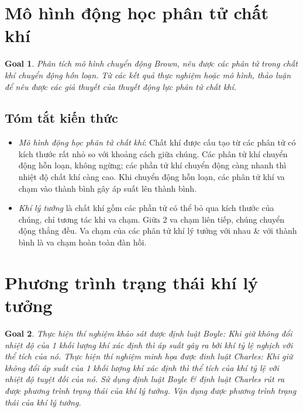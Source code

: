 \documentclass{article}
\newtheorem{goal}{Goal}
\begin{document}

\section{Mô hình động học phân tử chất khí}

\begin{goal}
	Phân tích mô hình chuyển động Brown, nêu được các phân tử trong chất khí chuyển động hỗn loạn. Từ các kết quả thực nghiệm hoặc mô hình, thảo luận để nêu được các giả thuyết của thuyết động lực phân tử chất khí.
\end{goal}

\subsection{Tóm tắt kiến thức}

\begin{itemize}
	\item {\it Mô hình động học phân tử chất khí}: Chất khí được cấu tạo từ các phân tử có kích thước rất nhỏ so với khoảng cách giữa chúng. Các phân tử khí chuyển động hỗn loạn, không ngừng; các phần tử khí chuyển động càng nhanh thì nhiệt độ chất khí càng cao. Khi chuyển động hỗn loạn, các phân tử khí va chạm vào thành bình gây áp suất lên thành bình.
	\item {\it Khí lý tưởng} là chất khí gồm các phần tử có thể bỏ qua kích thước của chúng, chỉ tương tác khi va chạm. Giữa 2 va chạm liên tiếp, chúng chuyển động thẳng đều. Va chạm của các phân tử khí lý tưởng với nhau \& với thành bình là va chạm hoàn toàn đàn hồi.
\end{itemize}


\section{Phương trình trạng thái khí lý tưởng}

\begin{goal}
	Thực hiện thí nghiệm khảo sát được định luật Boyle: Khi giữ không đổi nhiệt độ của 1 khối lượng khí xác định thì áp suất gây ra bởi khí tỷ lệ nghịch với thể tích của nó. Thực hiện thí nghiệm minh họa được đinh luật Charles: Khi giữ không đổi áp suất của 1 khối lượng khí xác định thì thể tích của khí tỷ lệ với nhiệt độ tuyệt đối của nó. Sử dụng định luật Boyle \& định luật Charles rút ra được phương trình trạng thái của khí lý tưởng. Vận dụng được phương trình trạng thái của khí lý tưởng.
\end{goal}
\end{document}
